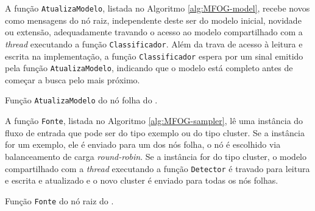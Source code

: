 A função \texttt{AtualizaModelo}, listada no Algoritmo
\ref{alg:MFOG-model}, recebe novos \mclusters como mensagens do nó raiz,
independente deste \mcluster ser do modelo inicial, novidade ou extensão,
adequadamente travando o acesso ao modelo compartilhado com a \emph{thread}
executando a função \texttt{Classificador}.
Além da trava de acesso à leitura e escrita na implementação, a função
\texttt{Classificador} espera por um sinal emitido pela função
\texttt{AtualizaModelo}, indicando que o modelo está completo antes de começar a
busca pelo \mclusters mais próximo.

\begin{algorithm}[htb]
    
\caption{Função \texttt{AtualizaModelo} do nó folha do \mfog.}
\label{alg:MFOG-model}
\end{algorithm}

A função \texttt{Fonte}, listada no Algoritmo \ref{alg:MFOG-sampler}, lê uma
instância do fluxo de entrada que pode ser do tipo exemplo ou do tipo cluster.
Se a instância for um exemplo, ele é enviado para um dos nós folha, o nó é
escolhido via balanceamento de carga \emph{round-robin}.
Se a instância for do tipo cluster, o modelo compartilhado com a \emph{thread}
executando a função \texttt{Detector} é travado para leitura e escrita e
atualizado e o novo cluster é enviado para todas os nós folhas.

\begin{algorithm}[htb]
    
\caption{Função \texttt{Fonte} do nó raiz do \mfog.}
\label{alg:MFOG-sampler}
\end{algorithm}

